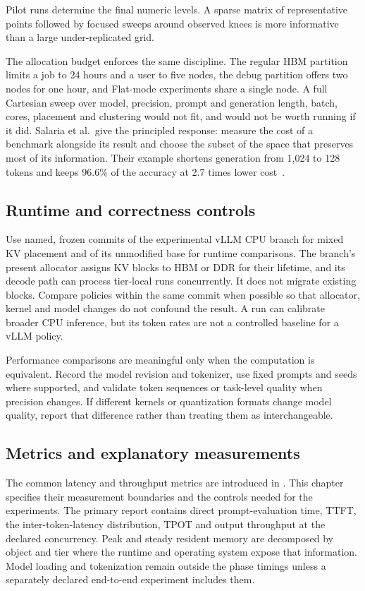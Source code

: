 Pilot runs determine the final numeric levels.  A sparse matrix of
representative points followed by focused sweeps around observed knees
is more informative than a large under-replicated grid.

The allocation budget enforces the same discipline.  The regular HBM
partition limits a job to 24 hours and a user to five nodes, the debug
partition offers two nodes for one hour, and Flat-mode experiments share
a single node.  A full Cartesian sweep over model, precision, prompt and
generation length, batch, cores, placement and clustering would not fit,
and would not be worth running if it did.  Salaria et al.\ give the
principled response: measure the cost of a benchmark alongside its
result and choose the subset of the space that preserves most of its
information.  Their example shortens generation from 1{,}024 to 128
tokens and keeps 96.6\% of the accuracy at 2.7 times lower
cost~\cite{salaria2025metametrics}.

\subsection{Runtime and correctness controls}

Use named, frozen commits of the experimental vLLM CPU branch for mixed
KV placement and of its unmodified base for runtime comparisons.  The
branch's present allocator assigns KV blocks to HBM or DDR for their
lifetime, and its decode path can process tier-local runs concurrently.
It does not migrate existing blocks.  Compare policies within the same
commit when possible so that allocator, kernel and model changes do not
confound the result.  A \lcpp{} run can calibrate broader CPU inference,
but its token rates are not a controlled baseline for a vLLM policy.

Performance comparisons are meaningful only when the computation is
equivalent.  Record the model revision and tokenizer, use fixed prompts
and seeds where supported, and validate token sequences or task-level
quality when precision changes.  If different kernels or quantization
formats change model quality, report that difference rather than
treating them as interchangeable.

\subsection{Metrics and explanatory measurements}

The common latency and throughput metrics are introduced in
.  This chapter specifies their measurement
boundaries and the controls needed for the experiments.  The primary report
contains direct prompt-evaluation time, TTFT, the inter-token-latency
distribution, TPOT and output throughput at the declared concurrency.
Peak and steady resident memory are decomposed by object and tier where
the runtime and operating system expose that information.  Model loading
and tokenization remain outside the phase timings unless a separately
declared end-to-end experiment includes them.

